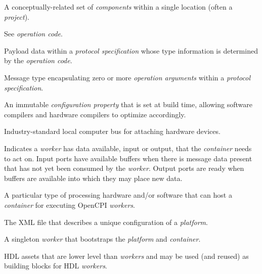 \begin{description}[style=nextline]
\item[Library]
A conceptually-related set of \textit{components} within a single location (often a \textit{project}).


\item[OpCode]
See \textit{operation code}.

\item[Operation Argument]
Payload data within a \textit{protocol specification} whose type information is determined by the \textit{operation code}.

\item[Operation Code]
Message type encapsulating zero or more \textit{operation arguments} within a \textit{protocol specification}.

\item[Parameter]
An immutable \textit{configuration property} that is set at build time, allowing software compilers and hardware compilers to optimize accordingly.

\item[PCI (Peripheral Component Interconnect)]
Industry-standard local computer bus for attaching hardware devices.

\item[Port Readiness]
Indicates a \textit{worker} has data available, input or output, that the \textit{container} needs to act on. Input ports have available buffers when there is message data present that has not yet been consumed by the \textit{worker}. Output ports are ready when buffers are available into which they may place new data.

\item[Platform]
A particular type of processing hardware and/or software that can host a \textit{container} for executing OpenCPI \textit{workers}.

\item[Platform Configuration]
The XML file that describes a unique configuration of a \textit{platform}.

\item[Platform Worker]
A singleton \textit{worker} that bootstraps the \textit{platform} and \textit{container}.

\item[Primitive]
HDL assets that are lower level than \textit{workers} and may be used (and reused) as building blocks for HDL \textit{workers}.


\end{description}
